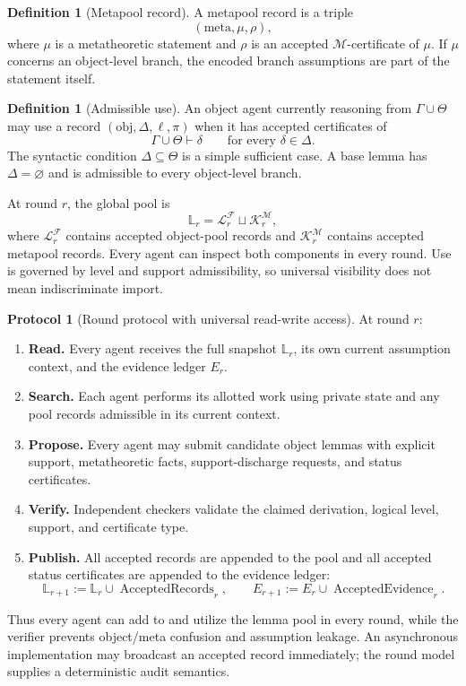 \documentclass[11pt]{article}
\theoremstyle{definition}
\newtheorem{definition}[theorem]{Definition}
\newtheorem{protocol}[theorem]{Protocol}
\theoremstyle{remark}
\newcommand{\Pool}{\mathcal L}
\newcommand{\MetaPool}{\mathcal K}
\newcommand{\M}{\mathcal M}
\newcommand{\F}{\mathcal F}
\newcommand{\Gammaa}{\Gamma}
\begin{document}
\begin{definition}[Metapool record]
A metapool record is a triple
\[
(\mathrm{meta},\mu,\rho),
\]
where $\mu$ is a metatheoretic statement and $\rho$ is an accepted $\M$-certificate of $\mu$. If $\mu$ concerns an object-level branch, the encoded branch assumptions are part of the statement itself.
\end{definition}

\begin{definition}[Admissible use]
An object agent currently reasoning from $\Gammaa\cup\Theta$ may use a record $(\mathrm{obj},\Delta,\ell,\pi)$ when it has accepted certificates of
\[
\Gammaa\cup\Theta\vdash\delta
\qquad\text{for every }\delta\in\Delta.
\]
The syntactic condition $\Delta\subseteq\Theta$ is a simple sufficient case. A base lemma has $\Delta=\varnothing$ and is admissible to every object-level branch.
\end{definition}

At round $r$, the global pool is
\[
\mathbb L_r=\Pool_r^{\F}\sqcup\MetaPool_r^{\M},
\]
where $\Pool_r^{\F}$ contains accepted object-pool records and $\MetaPool_r^{\M}$ contains accepted metapool records. Every agent can inspect both components in every round. Use is governed by level and support admissibility, so universal visibility does not mean indiscriminate import.

\begin{protocol}[Round protocol with universal read-write access]
At round $r$:
\begin{enumerate}[label=\textbf{R\arabic*.}]
  \item \textbf{Read.} Every agent receives the full snapshot $\mathbb L_r$, its own current assumption context, and the evidence ledger $E_r$.
  \item \textbf{Search.} Each agent performs its allotted work using private state and any pool records admissible in its current context.
  \item \textbf{Propose.} Every agent may submit candidate object lemmas with explicit support, metatheoretic facts, support-discharge requests, and status certificates.
  \item \textbf{Verify.} Independent checkers validate the claimed derivation, logical level, support, and certificate type.
  \item \textbf{Publish.} All accepted records are appended to the pool and all accepted status certificates are appended to the evidence ledger:
  \[
  \mathbb L_{r+1}:=\mathbb L_r\cup\operatorname{AcceptedRecords}_r,
  \qquad
  E_{r+1}:=E_r\cup\operatorname{AcceptedEvidence}_r.
  \]
\end{enumerate}
Thus every agent can add to and utilize the lemma pool in every round, while the verifier prevents object/meta confusion and assumption leakage. An asynchronous implementation may broadcast an accepted record immediately; the round model supplies a deterministic audit semantics.
\end{protocol}
\end{document}
